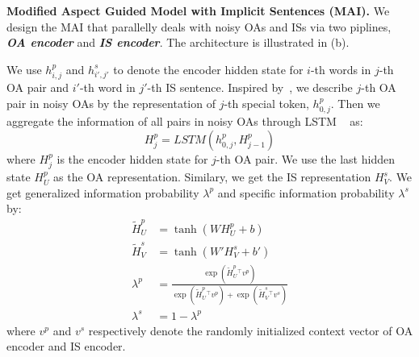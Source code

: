 {%

\textbf{Modified Aspect Guided Model with Implicit Sentences (MAI).}
We design the MAI that parallelly deals with noisy OAs and ISs
via two piplines, \textbf{\em OA encoder} and \textbf{\em IS encoder}. 
The architecture is illustrated in (b).

We use $h^p_{i,j}$ and $h^s_{i',j'}$ to denote the encoder hidden state for $i$-th words in $j$-th OA pair
and $i'$-th word in $j'$-th IS sentence.
Inspired by~\citet{DialogMV2020},
we describe $j$-th OA pair in noisy OAs by 
the representation of $j$-th special token, $h^p_{0,j}$.
Then we aggregate the information of all pairs in noisy OAs through LSTM 
~\cite{LSTM1997,DialogMV2020} as:
\begin{equation}
	H^p_j = LSTM(h^p_{0,j}, H^p_{j-1})
\end{equation}
where $H^p_j$ is the encoder hidden state for $j$-th OA pair.
We use the last hidden state $H^p_U$ as the OA representation.
Similary, we get the IS representation $H^s_V$.
We get {generalized information probability} $\lambda^p$ and 
{specific information probability} $\lambda^s$ by:
\begin{align}
	\tilde{H}^p_U &= \tanh(WH^p_U+b) \\
	\tilde{H}^s_V &= \tanh(W'H^s_V+b') \\
    \lambda^p &= \frac{\exp(\tilde{H}^p_U {^\top} v^p)}{\exp(\tilde{H}^p_U {^\top} v^p)+\exp(\tilde{H}^s_V {^\top} v^s)} \\
	\lambda^s &= 1-\lambda^p 
\end{align}
where $v^p$ and $v^s$ respectively denote the randomly initialized context vector of OA encoder and IS encoder.
}
